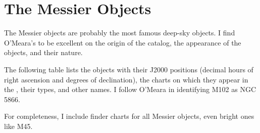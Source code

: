 
\chapter*{The Messier Objects}

The Messier objects are probably the most famous deep-sky objects. I find O’Meara’s  to be excellent  on the origin of the catalog, the appearance of the objects, and their nature.

The following table lists the objects with their J2000 positions (decimal hours of right ascension and degrees of declination), the charts on which they appear in the {\PSA}, their types, and other names. I follow O’Meara in identifying M102 as NGC 5866.

For completeness, I include finder charts for all Messier objects, even bright ones like M45.


\clearpage



\clearpage


\clearpage

